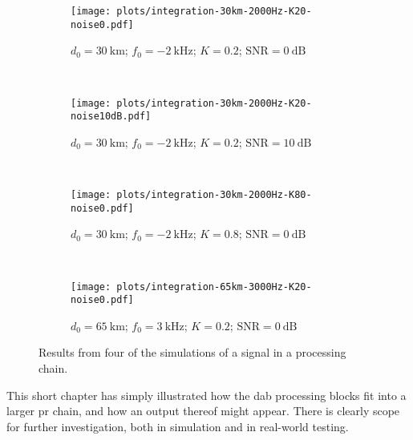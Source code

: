\documentclass[class=report,11pt,crop=false]{standalone}
\begin{document}
\begin{figure}[htbp]
    \centering
    \captionsetup{type=figure}
    \begin{subfigure}[t]{0.49\textwidth}
        \centering
        \captionsetup{type=figure}
        \texttt{[image: plots/integration-30km-2000Hz-K20-noise0.pdf]}
        \caption{\(d_0 = \SI{30}{\kilo\metre}\); \(f_0 = \SI{-2}{\kilo\hertz}\); \(K = 0.2\); \(\textrm{SNR} = \SI{0}{\deci\bel}\)}
        \label{fig:integration-simulation-1}
    \end{subfigure}%
    ~~
    \begin{subfigure}[t]{0.49\textwidth}
        \centering
        \captionsetup{type=figure}
        \texttt{[image: plots/integration-30km-2000Hz-K20-noise10dB.pdf]}
        \caption{\(d_0 = \SI{30}{\kilo\metre}\); \(f_0 = \SI{-2}{\kilo\hertz}\); \(K = 0.2\); \(\textrm{SNR} = \SI{10}{\deci\bel}\)}
        \label{fig:integration-simulation-2}
    \end{subfigure}%
    \\
    \begin{subfigure}[t]{0.49\textwidth}
        \centering
        \captionsetup{type=figure}
        \texttt{[image: plots/integration-30km-2000Hz-K80-noise0.pdf]}
        \caption{\(d_0 = \SI{30}{\kilo\metre}\); \(f_0 = \SI{-2}{\kilo\hertz}\); \(K = 0.8\); \(\textrm{SNR} = \SI{0}{\deci\bel}\)}
        \label{fig:integration-simulation-3}
    \end{subfigure}%
    ~~
    \begin{subfigure}[t]{0.49\textwidth}
        \centering
        \captionsetup{type=figure}
        \texttt{[image: plots/integration-65km-3000Hz-K20-noise0.pdf]}
        \caption{\(d_0 = \SI{65}{\kilo\metre}\); \(f_0 = \SI{+3}{\kilo\hertz}\); \(K = 0.2\); \(\textrm{SNR} = \SI{0}{\deci\bel}\)}
        \label{fig:integration-simulation-4}
    \end{subfigure}%
    \caption{Results from four of the simulations of a  signal in a  processing chain.}
    \label{fig:integration-simulation-all}
\end{figure}

This short chapter has simply illustrated how the \gls{dab} processing blocks fit into a larger \gls{pr} chain, and how an output thereof might appear. There is clearly scope for further investigation, both in simulation and in real-world testing.

\ifstandalone

\printnoidxglossary[type=\acronymtype,nonumberlist]
\fi
\end{document}
